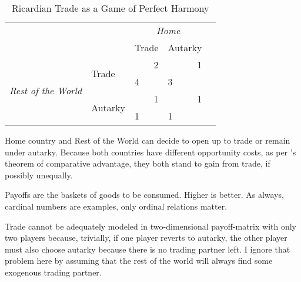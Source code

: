 \begin{table}
	\caption[The Trade Game]{Ricardian Trade as a Game of Perfect Harmony}
	\label{tab:trade}
	\begin{center}
	\begin{tabular}
		{m{1cm}
		m{}
		m{}
		m{}
		m{}}

&
& \multicolumn{2}{c}{\emph{Home}} 
\\


& 
&Trade 
&Autarky
\\ 

\cline{3-4}

\multicolumn{1}{c}{\multirow{4}{*}{\emph{Rest of the World}}} 
& \multirow{2}{2,3cm}{Trade} 
& 		\multicolumn{1}{|r|}{2} 
& \multicolumn{1}{r|}{1}
\\ 


\multicolumn{1}{c}{} 
& \multicolumn{1}{c}{}
& \multicolumn{1}{|l|}{4} 
& \multicolumn{1}{l|}{3}
\\ 

\cline{3-4}

\multicolumn{1}{c}{} 
& \multirow{2}{2,3cm}{Autarky} 
& \multicolumn{1}{|r|}{1} 
& \multicolumn{1}{r|}{1}
\\ 


\multicolumn{1}{c}{} 
& \multicolumn{1}{c}{}
& \multicolumn{1}{|l|}{1}
& \multicolumn{1}{l|}{1}
\\ 

\cline{3-4}
\end{tabular}
\end{center}
	
\scriptsize{
	Home country and Rest of the World can decide to open up to trade or remain under autarky. 
	Because both countries have different opportunity costs, as per \citeauthor{Ricardo1817}'s theorem of comparative advantage, they both stand to gain from trade, if possibly unequally.
	
	Payoffs are the baskets of goods to be consumed. 
	Higher is better. 
	As always, cardinal numbers are examples, only ordinal relations matter.
	
	Trade cannot be adequately modeled in two-dimensional payoff-matrix with only two players because, trivially, if one player reverts to autarky, the other player must also choose autarky because there is no trading partner left. 
	I ignore that problem here by assuming that the rest of the world will always find some exogenous trading partner.
}
\end{table}

